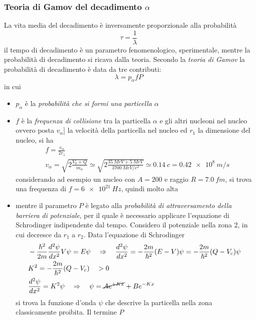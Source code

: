 \subsubsection{Teoria di Gamov del decadimento $\alpha$}
La vita media del decadimento è inversamente proporzionale alla probabilità
\begin{equation}
\tau = \frac{1}{\lambda}
\end{equation}
il tempo di decadimento è un parametro fenomenologico, sperimentale, mentre la probabilità di decadimento si ricava dalla teoria.
Secondo la \emph{teoria di Gamov} la probabilità di decadimento è data da tre contributi:
\begin{equation}
\lambda = p_{\alpha} f P
\end{equation}
in cui
\begin{itemize}
\item $p_{\alpha}$ è la \emph{probabilità che si formi una particella $\alpha$}

\item $f$ è la \emph{frequenza di collisione} tra la particella $\alpha$ e gli altri nucleoni nel nucleo ovvero posta $v_{\alpha}]$ la velocità della particella nel nucleo ed $r_1$ la dimensione del nucleo, si ha 
\begin{equation}
\begin{split}
& f = \frac{v_{\alpha}}{2 r_1} \\
& v_{\alpha} = \sqrt{ 2\frac{V_0 + Q}{m_{\alpha}} } \simeq \sqrt{ 2\frac{\SI{35}{MeV} + \SI{5}{MeV}}{\SI{3700}{MeV/c^2}} } \simeq \SI{0.14}{c} = \SI{0.42e8}{m/s}
\end{split}
\end{equation}
considerando ad esempio un nucleo con $A=200$ e raggio $R = \SI{7.0}{fm}$, si trova una frequenza di $f = \SI{6e21}{Hz}$, quindi molto alta

\item mentre il parametro $P$ è legato alla \emph{probabilità di attraversamento della barriera di potenziale}, per il quale è necessario applicare l'equazione di Schrodinger indipendente dal tempo.
Considero il potenziale nella zona 2, in cui decresce da $r_1$ a $r_2$.
Data l'equazione di Schrodinger
\begin{equation}
\begin{split}
& -\frac{\hbar^2}{2m} \frac{d^2 \psi}{dx^2} V \psi = E \psi \quad\Rightarrow\quad 
\frac{d^2\psi}{dx^2} = - \frac{2m}{\hbar^2} (E-V)\psi = -\frac{2m}{\hbar^2} (Q-V_c)\psi \\
& K^2 =  -\frac{2m}{\hbar^2} (Q-V_c) \quad > 0 \\
&  \frac{d^2\psi}{dx^2} = K^2 \psi \quad\Rightarrow\quad \psi = \cancel{A e^{+ K x}} + Be^{- K x}
\end{split}
\end{equation}
si trova la funzione d'onda $\psi$ che descrive la particella nella zona classicamente proibita.
Il termine $P$


\end{itemize}















